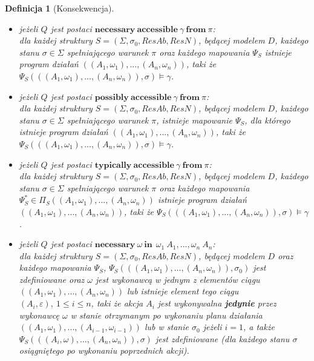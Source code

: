 \documentclass[11pt,a4paper]{article}
\newtheorem{definition}{Definicja}[section]
\begin{document}
\begin{definition}[Konsekwencja]
\begin{itemize}
    	\item jeżeli $Q$ jest postaci $\mathbf{necessary}~\mathbf{accessible}~\gamma~\mathbf{from}~\pi$: \\
    	dla każdej struktury $S=(\Sigma, \sigma_0, ResAb, ResN)$, będącej modelem $D$, każdego stanu $\sigma \in \Sigma$ spełniającego warunek $\pi$ oraz każdego mapowania $\Psi_S$ istnieje program działań $((A_1, \omega_1), ..., (A_n, \omega_n))$, taki że $\Psi_S(((A_1, \omega_1), ..., (A_n, \omega_n)), \sigma) \models \gamma$.
    	
    	\item jeżeli $Q$ jest postaci $\mathbf{possibly}~\mathbf{accessible}~\gamma~\mathbf{from}~\pi$: \\
    	dla każdej struktury $S=(\Sigma, \sigma_0, ResAb, ResN)$, będącej modelem $D$, każdego stanu $\sigma \in \Sigma$ spełniającego warunek $\pi$, istnieje mapowanie $\Psi_S$, dla którego istnieje program działań $((A_1, \omega_1), ..., (A_n, \omega_n))$, taki że $\Psi_S(((A_1, \omega_1), ..., (A_n, \omega_n)), \sigma) \models \gamma$.
    	
    	\item jeżeli $Q$ jest postaci $\mathbf{typically}~\mathbf{accessible}~\gamma~\mathbf{from}~\pi$: \\
    	dla każdej struktury $S=(\Sigma, \sigma_0, ResAb, ResN)$, będącej modelem $D$, każdego stanu $\sigma \in \Sigma$ spełniającego warunek $\pi$ oraz każdego mapowania $\Psi_S^{*} \in \Pi_S((A_1, \omega_1),...,(A_n,\omega_n))$ istnieje program działań $((A_1, \omega_1), ..., (A_n, \omega_n))$, taki że $\Psi_S(((A_1, \omega_1), ..., (A_n, \omega_n)), \sigma) \models \gamma$.
    	
    	\item jeżeli $Q$ jest postaci $\mathbf{necessary}~\omega~\mathbf{in}~~\omega_1~A_1, ..., \omega_n~A_n$: \\
    	 dla każdej struktury $S=(\Sigma, \sigma_0, ResAb, ResN)$, będącej modelem $D$ oraz każdego mapowania $\Psi_S$, $\Psi_S(((A_1, \omega_1), ..., (A_n, \omega_n)), \sigma_0)$ jest zdefiniowane oraz $\omega$ jest wykonawcą w jednym z elementów ciągu $((A_1, \omega_1),...,(A_n,\omega_n))$ lub istnieje element tego ciągu $(A_i, \varepsilon),~1 \leq i \leq n$, taki że akcja $A_i$ jest wykonywalna \textbf{jedynie} przez wykonawcę $\omega$ w stanie otrzymanym po wykonaniu planu działania $((A_1, \omega_1),...,(A_{i-1},\omega_{i-1}))$ lub w stanie $\sigma_0$ jeżeli $i=1$, a także $\Psi_S(((A_i, \omega), ..., (A_n, \omega_n)), \sigma)$ jest zdefiniowane (dla każdego stanu $\sigma$ osiągniętego po wykonaniu poprzednich akcji).
    	 

\end{itemize}
\end{definition}
\end{document}
